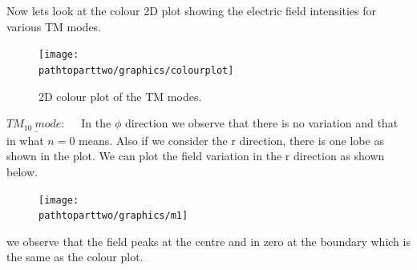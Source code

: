 Now lets look at the colour 2D plot showing the electric field intensities for various TM modes.
\begin{figure}[h]
\centering
\texttt{[image: \\pathtoparttwo/graphics/colourplot]}
\caption{2D colour plot of the TM modes.}
\label{fig:colourplot}
\end{figure}
$\underline{TM_{10} \ mode:}$ \ \ In the $\phi$ direction we observe that there is no variation and that in what $n=0$ means. Also if we consider the r direction, there is one lobe as shown in the plot. We can plot the field variation  in the r direction as shown below.
\begin{figure}[h]
\centering
\texttt{[image: \\pathtoparttwo/graphics/m1]}
\caption{}
\label{fig:m1}
\end{figure}
we observe that the field peaks at the centre and in zero at the boundary which is the same as the colour plot.
      

